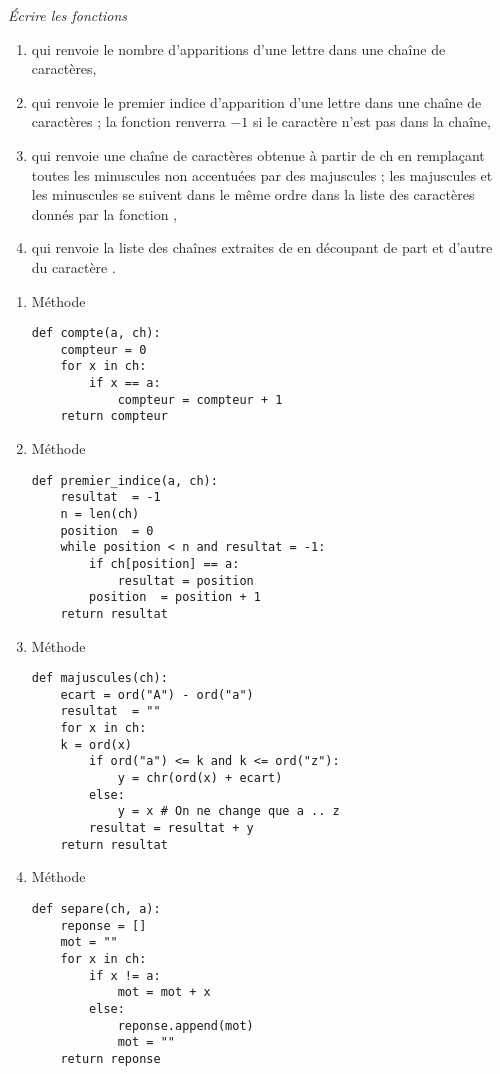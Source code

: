 \begin{Exercise}[title={Écriture des méthodes}]\it
Écrire les fonctions 
\begin{enumerate}
    \item {} qui renvoie le nombre d'apparitions d'une lettre dans une chaîne de caractères,
    \item {} qui renvoie le premier indice d'apparition d'une lettre dans une chaîne de caractères ; la fonction renverra $-1$ si le caractère n'est pas dans la chaîne,
    \item {} qui renvoie une chaîne de caractères obtenue à partir de {ch} en remplaçant toutes les minuscules non accentuées par des majuscules ; les majuscules et les minuscules se suivent dans le même ordre dans la liste des caractères donnés par la fonction ,
    \item {} qui renvoie la liste des chaînes extraites de  en découpant de part et d'autre du caractère .
\end{enumerate}
\end{Exercise}
\begin{Answer}
\begin{enumerate}
\item Méthode 
\begin{lstlisting}
def compte(a, ch):
    compteur = 0
    for x in ch:
        if x == a:
            compteur = compteur + 1
    return compteur
\end{lstlisting}
\item Méthode 
\begin{lstlisting}
def premier_indice(a, ch):
    resultat  = -1
    n = len(ch)
    position  = 0
    while position < n and resultat = -1:
        if ch[position] == a:
            resultat = position
        position  = position + 1
    return resultat
\end{lstlisting}
\item Méthode 

\begin{lstlisting}
def majuscules(ch):
    ecart = ord("A") - ord("a")
    resultat  = ""
    for x in ch:
    k = ord(x)
        if ord("a") <= k and k <= ord("z"):
            y = chr(ord(x) + ecart)
        else:
            y = x # On ne change que a .. z
        resultat = resultat + y
    return resultat
\end{lstlisting}
\item Méthode 

\begin{lstlisting}
def separe(ch, a):
    reponse = []
    mot = ""
    for x in ch:
        if x != a:
            mot = mot + x
        else:
            reponse.append(mot)
            mot = ""
    return reponse
\end{lstlisting}
\end{enumerate}
\newpage
\end{Answer}
